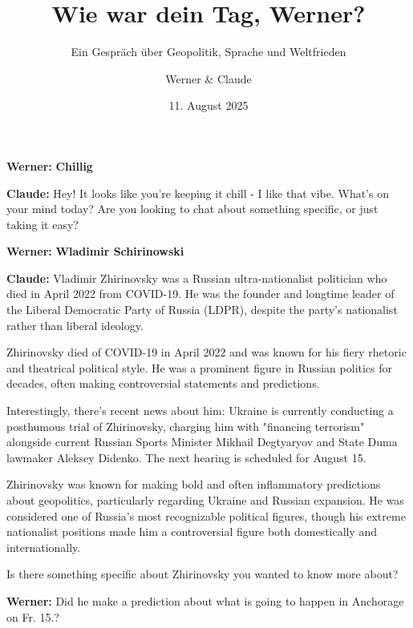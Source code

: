 \documentclass[11pt,a5paper]{scrartcl}
\title{Wie war dein Tag, Werner?}
\subtitle{Ein Gespräch über Geopolitik, Sprache und Weltfrieden}
\author{Werner \& Claude}
\date{11. August 2025}
\begin{document}
\maketitle

\begin{humanbox}
\textbf{Werner:} \textbf{Chillig}
\end{humanbox}

\begin{claudebox}
\textbf{Claude:} Hey! It looks like you're keeping it chill - I like that vibe. What's on your mind today? Are you looking to chat about something specific, or just taking it easy?
\end{claudebox}

\begin{humanbox}
\textbf{Werner:} \textbf{Wladimir Schirinowski}
\end{humanbox}

\begin{claudebox}
\textbf{Claude:} Vladimir Zhirinovsky was a Russian ultra-nationalist politician who died in April 2022 from COVID-19. He was the founder and longtime leader of the Liberal Democratic Party of Russia (LDPR), despite the party's nationalist rather than liberal ideology.

Zhirinovsky died of COVID-19 in April 2022 and was known for his fiery rhetoric and theatrical political style. He was a prominent figure in Russian politics for decades, often making controversial statements and predictions.

Interestingly, there's recent news about him: Ukraine is currently conducting a posthumous trial of Zhirinovsky, charging him with "financing terrorism" alongside current Russian Sports Minister Mikhail Degtyaryov and State Duma lawmaker Aleksey Didenko. The next hearing is scheduled for August 15.

Zhirinovsky was known for making bold and often inflammatory predictions about geopolitics, particularly regarding Ukraine and Russian expansion. He was considered one of Russia's most recognizable political figures, though his extreme nationalist positions made him a controversial figure both domestically and internationally.

Is there something specific about Zhirinovsky you wanted to know more about?
\end{claudebox}

\begin{humanbox}
\textbf{Werner:} Did he make a prediction about what is going to happen in Anchorage on Fr. 15.?
\end{humanbox}
\end{document}
